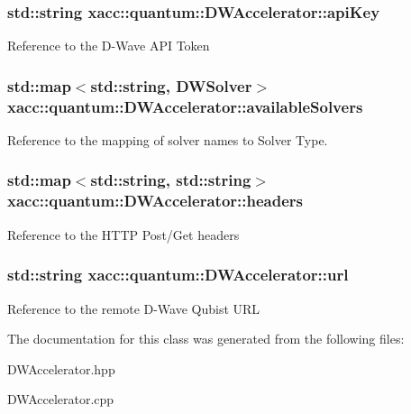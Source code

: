 \subsubsection[{\texorpdfstring{api\+Key}{apiKey}}]{\setlength{\rightskip}{0pt plus 5cm}std\+::string xacc\+::quantum\+::\+D\+W\+Accelerator\+::api\+Key\hspace{0.3cm}{\ttfamily [protected]}}\hypertarget{a00042_a6b9ca421d7efeed09ff9acb9f77d9dd8}{}\label{a00042_a6b9ca421d7efeed09ff9acb9f77d9dd8}
Reference to the D-\/\+Wave A\+PI Token 
\subsubsection[{\texorpdfstring{available\+Solvers}{availableSolvers}}]{\setlength{\rightskip}{0pt plus 5cm}std\+::map$<$std\+::string, {\bf D\+W\+Solver}$>$ xacc\+::quantum\+::\+D\+W\+Accelerator\+::available\+Solvers\hspace{0.3cm}{\ttfamily [protected]}}\hypertarget{a00042_ac19954e3df9e77184717c9be8a2ed4c5}{}\label{a00042_ac19954e3df9e77184717c9be8a2ed4c5}
Reference to the mapping of solver names to Solver Type. 
\subsubsection[{\texorpdfstring{headers}{headers}}]{\setlength{\rightskip}{0pt plus 5cm}std\+::map$<$std\+::string, std\+::string$>$ xacc\+::quantum\+::\+D\+W\+Accelerator\+::headers\hspace{0.3cm}{\ttfamily [protected]}}\hypertarget{a00042_a031df31e3ff84f33ea9a76bfc0f9277c}{}\label{a00042_a031df31e3ff84f33ea9a76bfc0f9277c}
Reference to the H\+T\+TP Post/\+Get headers 
\subsubsection[{\texorpdfstring{url}{url}}]{\setlength{\rightskip}{0pt plus 5cm}std\+::string xacc\+::quantum\+::\+D\+W\+Accelerator\+::url\hspace{0.3cm}{\ttfamily [protected]}}\hypertarget{a00042_a934db80f3cf6aa68158a66bc053c0c27}{}\label{a00042_a934db80f3cf6aa68158a66bc053c0c27}
Reference to the remote D-\/\+Wave Qubist U\+RL 

The documentation for this class was generated from the following files\+:\begin{DoxyCompactItemize}
\item 
D\+W\+Accelerator.\+hpp\item 
D\+W\+Accelerator.\+cpp\end{DoxyCompactItemize}
